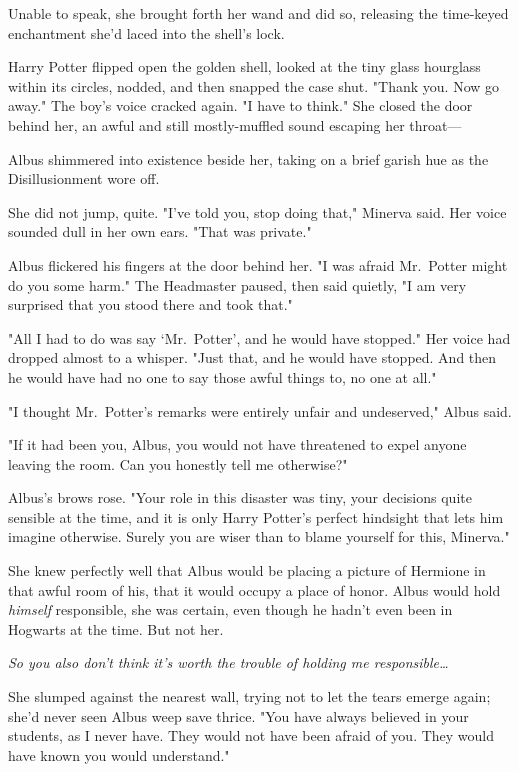Unable to speak, she brought forth her wand and did so, releasing the 
time-keyed enchantment she'd laced into the shell's lock.

Harry Potter flipped open the golden shell, looked at the tiny glass hourglass 
within its circles, nodded, and then snapped the case shut. "Thank you. Now go 
away." The boy's voice cracked again. "I have to think."
\sbreak
She closed the door behind her, an awful and still mostly-muffled sound 
escaping her throat---

Albus shimmered into existence beside her, taking on a brief garish hue as the 
Disillusionment wore off.

She did not jump, quite. "I've told you, stop doing that," Minerva said. Her 
voice sounded dull in her own ears. "That was private."

Albus flickered his fingers at the door behind her. "I was afraid Mr.~Potter 
might do you some harm." The Headmaster paused, then said quietly, "I am very 
surprised that you stood there and took that."

"All I had to do was say `Mr.~Potter', and he would have stopped." Her voice 
had dropped almost to a whisper. "Just that, and he would have stopped. And 
then he would have had no one to say those awful things to, no one at all."

"I thought Mr.~Potter's remarks were entirely unfair and undeserved," Albus 
said.

"If it had been you, Albus, you would not have threatened to expel anyone 
leaving the room. Can you honestly tell me otherwise?"

Albus's brows rose. "Your role in this disaster was tiny, your decisions quite 
sensible at the time, and it is only Harry Potter's perfect hindsight that lets 
him imagine otherwise. Surely you are wiser than to blame yourself for this, 
Minerva."

She knew perfectly well that Albus would be placing a picture of Hermione in 
that awful room of his, that it would occupy a place of honor. Albus would hold 
\emph{himself} responsible, she was certain, even though he hadn't even been in 
Hogwarts at the time. But not her.

\emph{So you also don't think it's worth the trouble of holding me 
responsible{\ldots}}

She slumped against the nearest wall, trying not to let the tears emerge again; 
she'd never seen Albus weep save thrice. "You have always believed in your 
students, as I never have. They would not have been afraid of you. They would 
have known you would understand."

